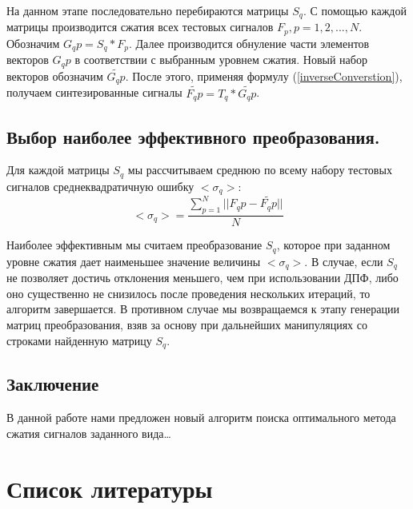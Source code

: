 \documentclass[11pt, oneside, a4paper]{article}
\begin{document}
На данном этапе последовательно перебираются матрицы $S_q$. С помощью каждой матрицы производится сжатия всех тестовых сигналов $F_p, p=1,2,...,N$. Обозначим $G_qp=S_q*F_p$. Далее производится обнуление части элементов векторов $G_qp$ в соответствии с выбранным уровнем сжатия. Новый набор векторов обозначим $\tilde{G_qp}$. После этого, применяя формулу (\ref{inverseConverstion}), получаем синтезированные сигналы $\tilde{F_qp}=T_q*\tilde{G_qp}$.

\subsection{Выбор наиболее эффективного преобразования.}

Для каждой матрицы $S_q$ мы рассчитываем среднюю по всему набору тестовых сигналов среднеквадратичную ошибку $<\sigma_q>$:
\begin{equation}
\label{squareNormQ}
    <\sigma_q> = \frac{\sum\limits_{p=1}^{N}||F_qp-\tilde{F_qp}||}{N}
\end{equation}

Наиболее эффективным мы считаем преобразование $S_q$, которое при заданном уровне сжатия дает наименьшее значение величины $<\sigma_q>$. В случае, если $S_q$ не позволяет достичь отклонения  меньшего, чем при использовании ДПФ, либо оно существенно не снизилось после проведения нескольких итераций, то алгоритм завершается. В противном случае мы возвращаемся к этапу генерации матриц преобразования, взяв за основу при дальнейших манипуляциях со строками найденную матрицу $S_q$.

\subsection{Заключение}

В данной работе нами предложен новый алгоритм поиска оптимального метода сжатия сигналов заданного вида…

\section{Список литературы}
\end{document}
